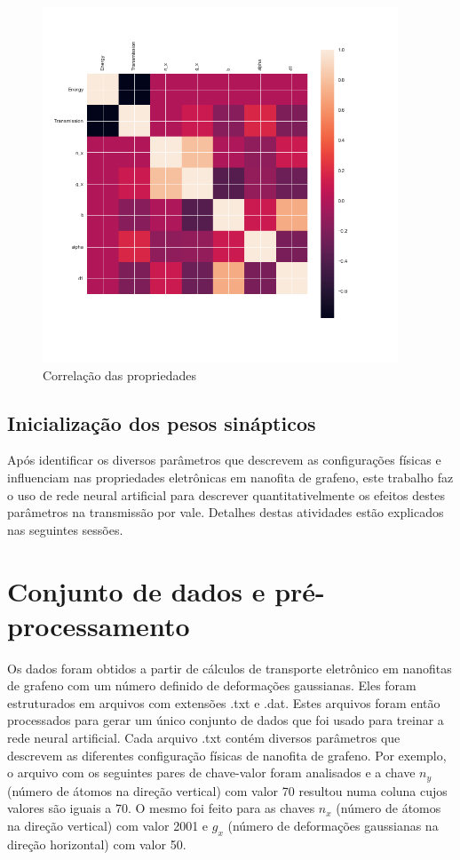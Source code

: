 \begin{figure}[H]
    \centering
  \includegraphics[width=300pt]{figuras/correlacao.png}
  \caption{Correlação das propriedades}
  \label{fig:correlacao}
\end{figure}

\subsection{Inicialização dos pesos sinápticos}

Após identificar os diversos parâmetros que descrevem as configurações físicas e influenciam nas propriedades eletrônicas em nanofita de grafeno, este trabalho faz o uso de rede neural artificial para descrever quantitativelmente os efeitos destes parâmetros na transmissão por vale. Detalhes destas atividades estão explicados nas seguintes sessões.

\section{Conjunto de dados e pré-processamento}
Os dados foram obtidos a partir de cálculos de  transporte eletrônico em nanofitas de grafeno com um número definido de deformações gaussianas. Eles foram estruturados em arquivos com extensões .txt e .dat. Estes arquivos foram então processados para gerar um único conjunto de dados que foi usado para treinar a rede neural artificial.
Cada arquivo .txt contém diversos parâmetros que descrevem as diferentes configuração físicas de nanofita de grafeno. Por exemplo, o arquivo com os seguintes pares de chave-valor foram analisados e a chave $n_y$ (número de átomos na direção vertical) com valor 70 resultou numa coluna cujos valores são iguais a 70. O mesmo foi feito para as chaves $n_x$ (número de átomos na direção vertical) com valor 2001 e $g_x$ (número de deformações gaussianas na direção horizontal) com valor 50.

